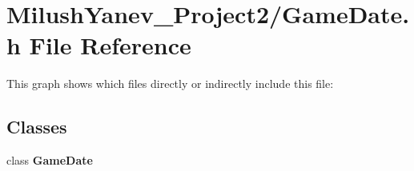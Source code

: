 \section{Milush\+Yanev\+\_\+\+Project2/\+Game\+Date.h File Reference}
\label{_game_date_8h}
This graph shows which files directly or indirectly include this file\+:
\subsection*{Classes}
\begin{DoxyCompactItemize}
\item 
class {\bf Game\+Date}
\end{DoxyCompactItemize}
